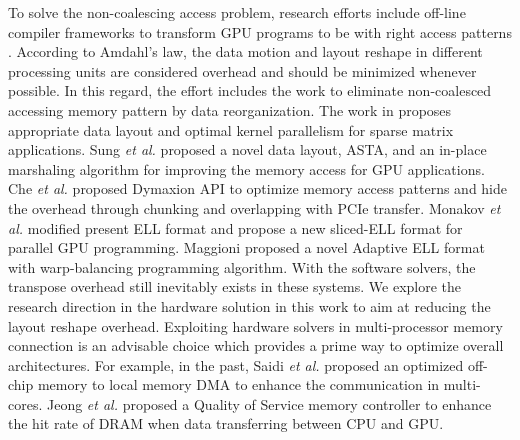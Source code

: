 \documentclass[10pt,journal,compsoc]{IEEEtran}
\begin{document}
To solve the non-coalescing access problem,
research efforts include off-line compiler frameworks to transform GPU programs
to be with  right access patterns \cite{AffineLoop}.
According to Amdahl's law,
the data motion and layout reshape in different processing units are considered
overhead and should be minimized whenever possible.
In this regard, the effort includes the work
to eliminate non-coalesced accessing memory pattern by data reorganization.
The work in \cite{ModelDrivenSpMV}\cite{AutoSpMV}
proposes appropriate data layout and optimal kernel parallelism for sparse matrix applications.
Sung \textit{et al.} \cite{ASTA} proposed a novel data layout, ASTA,
and an in-place marshaling algorithm for
 improving the memory access for GPU applications.
Che \textit{et al.} \cite{Dymaxion} proposed Dymaxion API to
optimize memory access patterns and hide the overhead through chunking
and overlapping with PCIe transfer.
Monakov \textit{et al.} \cite{AutoSpMV} modified present ELL format and propose a new sliced-ELL format for parallel GPU programming.
Maggioni \cite{AdELL} proposed a novel Adaptive ELL format with warp-balancing programming algorithm.
With the software solvers, the transpose overhead still inevitably exists in these systems.
We explore the research direction in the hardware solution
in this work to aim at reducing the layout reshape overhead.
Exploiting hardware solvers in multi-processor memory connection is an
advisable choice which provides a prime way to optimize
overall architectures.
For example, in the past, Saidi \textit{et al.} \cite{Cell} proposed an
optimized off-chip memory
to local memory DMA to enhance the communication in multi-cores.
Jeong \textit{et al.} \cite{QoS-Aware} proposed a Quality of Service
memory controller to enhance the hit rate of DRAM when data transferring
between CPU and GPU.

\end{document}
